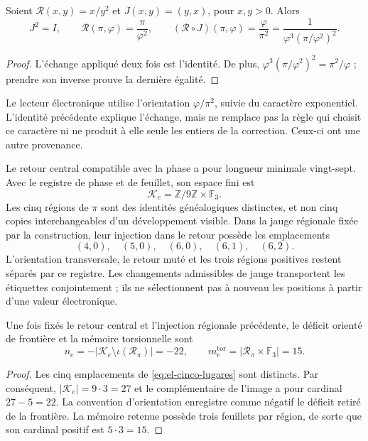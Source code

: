 \begin{lemma}
Soient \(\mathcal R(x,y)=x/y^2\) et \(J(x,y)=(y,x)\), pour \(x,y>0\).
Alors
\begin{equation}
 J^2=I,\qquad
 \mathcal R(\pi,\varphi)=\frac{\pi}{\varphi^2},\qquad
 (\mathcal R\circ J)(\pi,\varphi)=\frac{\varphi}{\pi^2}
 =\frac1{\varphi^3(\pi/\varphi^2)^2}.
 \label{eq:el-bisagra}
\end{equation}
\end{lemma}
\begin{proof}
L'échange appliqué deux fois est l'identité. De plus,
\(\varphi^3(\pi/\varphi^2)^2=\pi^2/\varphi\) ; prendre son inverse prouve
la dernière égalité.
\end{proof}

Le lecteur électronique utilise l'orientation \(\varphi/\pi^2\),
suivie du caractère exponentiel. L'identité précédente explique
l'échange, mais ne remplace pas la règle qui choisit ce caractère ni ne produit
à elle seule les entiers de la correction. Ceux-ci ont une autre provenance.

Le retour central compatible avec la phase a pour longueur minimale vingt-sept. Avec le registre de phase et de feuillet, son espace fini est
\[
 \mathcal K_e=\mathbb Z/9\mathbb Z\times\mathbb F_3.
\]
Les cinq régions de \(\pi\) sont des identités généalogiques distinctes,
et non cinq copies interchangeables d'un développement visible. Dans la jauge
régionale fixée par la construction, leur injection dans le retour possède
les emplacements
\begin{equation}
 (4,0),\quad(5,0),\quad(6,0),\quad(6,1),\quad(6,2).
 \label{eq:el-cinco-lugares}
\end{equation}
L'orientation transversale, le retour muté et les trois régions positives restent séparés par ce registre. Les changements admissibles de jauge transportent les étiquettes conjointement ; ils ne sélectionnent pas à nouveau les positions à partir d'une valeur électronique.

\begin{proposition}
Une fois fixés le retour central et l'injection régionale précédente, le déficit
orienté de frontière et la mémoire torsionnelle sont
\begin{equation}
 n_e=-|\mathcal K_e\setminus\iota(\mathscr R_\pi)|=-22,
 \qquad
 m_e^{\mathrm{tor}}=|\mathscr R_\pi\times\mathbb F_3|=15.
 \label{eq:el-selector-enteros}
\end{equation}
\end{proposition}
\begin{proof}
Les cinq emplacements de \eqref{eq:el-cinco-lugares} sont distincts. Par
conséquent, \(|\mathcal K_e|=9\cdot3=27\) et le complémentaire de l'image
a pour cardinal \(27-5=22\). La convention d'orientation enregistre comme
négatif le déficit retiré de la frontière. La mémoire retenue possède
trois feuillets par région, de sorte que son cardinal positif est
\(5\cdot3=15\).
\end{proof}

